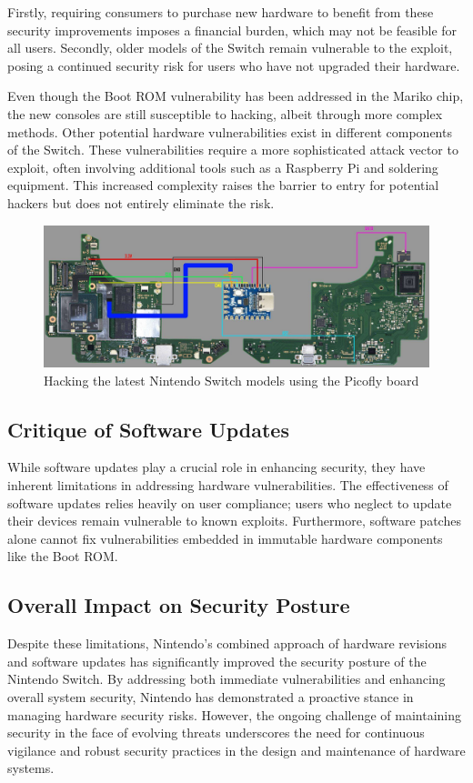 Firstly, requiring consumers to purchase new hardware to benefit from these security improvements imposes a financial burden, which may not be feasible for all users. Secondly, older models of the Switch remain vulnerable to the exploit, posing a continued security risk for users who have not upgraded their hardware.

Even though the Boot ROM vulnerability has been addressed in the Mariko chip, the new consoles are still susceptible to hacking, albeit through more complex methods. Other potential hardware vulnerabilities exist in different components of the Switch. These vulnerabilities require a more sophisticated attack vector to exploit, often involving additional tools such as a Raspberry Pi and soldering equipment. This increased complexity raises the barrier to entry for potential hackers but does not entirely eliminate the risk.\cite{wololoHowHackYour2023}

\begin{figure}[H]
    \centering
    \includegraphics[width=.8\linewidth]{images/picofly_board.jpg}
    \caption{Hacking the latest Nintendo Switch models using the Picofly board\cite{PicoflyAIOThread}}
    \label{fig:switch_boot}
\end{figure}

\subsection{Critique of Software Updates}
While software updates play a crucial role in enhancing security, they have inherent limitations in addressing hardware vulnerabilities. The effectiveness of software updates relies heavily on user compliance; users who neglect to update their devices remain vulnerable to known exploits. Furthermore, software patches alone cannot fix vulnerabilities embedded in immutable hardware components like the Boot ROM.
\subsection{Overall Impact on Security Posture}
Despite these limitations, Nintendo's combined approach of hardware revisions and software updates has significantly improved the security posture of the Nintendo Switch. By addressing both immediate vulnerabilities and enhancing overall system security, Nintendo has demonstrated a proactive stance in managing hardware security risks. However, the ongoing challenge of maintaining security in the face of evolving threats underscores the need for continuous vigilance and robust security practices in the design and maintenance of hardware systems.